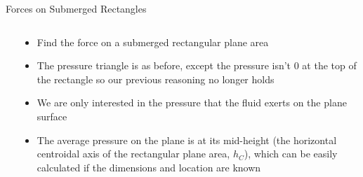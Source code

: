 \documentclass[9pt,xcolor={svgnames, x11names},professionalfonts, mathserif]{beamer}
\begin{document}


\begin{frame}{Forces on Submerged Rectangles}
 \begin{columns}
  \begin{column}{0.45\textwidth}
  \end{column}
  \begin{column}{0.55\textwidth}
   \begin{itemize}
    \item Find the force on a submerged rectangular plane area \pause
    \item The pressure triangle is as before, except the pressure isn't 0 at
          the top of the rectangle so our previous reasoning no longer holds \pause
    \item We are only interested in the pressure that the fluid exerts on the plane surface \pause
    \item The average pressure on the plane is at its mid-height (the horizontal centroidal axis of the rectangular
          plane area, $h_C$), which can be easily calculated if the dimensions and location are known
   \end{itemize}
  \end{column}
 \end{columns}
\end{frame}

\end{document}
